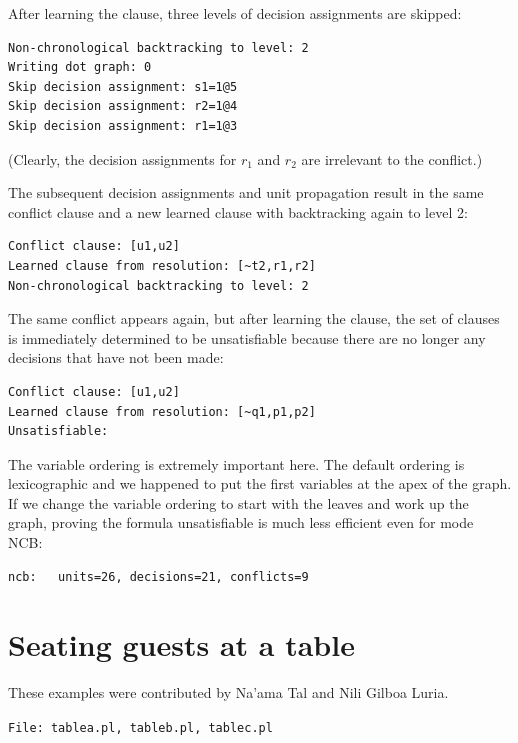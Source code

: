 \documentclass[11pt]{report}
\newcommand*{\p}[1]{\textup{\texttt{#1}}}
\newcommand*{\fl}[1]{\parbox{\textwidth}{\raggedleft \p{File: #1}}}
\begin{document}
After learning the clause, three levels of decision assignments are
skipped:
\begin{verbatim}
Non-chronological backtracking to level: 2
Writing dot graph: 0
Skip decision assignment: s1=1@5
Skip decision assignment: r2=1@4
Skip decision assignment: r1=1@3
\end{verbatim}
(Clearly, the decision assignments for $r_1$ and $r_2$ are irrelevant to
the conflict.)

The subsequent decision assignments and unit propagation result in the
same conflict clause and a new learned clause with backtracking again to
level 2:

\begin{verbatim}
Conflict clause: [u1,u2]
Learned clause from resolution: [~t2,r1,r2]
Non-chronological backtracking to level: 2
\end{verbatim}

The same conflict appears again, but after learning the clause, the set
of clauses is immediately determined to be unsatisfiable because there
are no longer any decisions that have not been made:

\begin{verbatim}
Conflict clause: [u1,u2]
Learned clause from resolution: [~q1,p1,p2]
Unsatisfiable:
\end{verbatim}

The variable ordering is extremely important here. The default ordering
is lexicographic and we happened to put the first variables at the apex
of the graph. If we change the variable ordering to start with the
leaves and work up the graph, proving the formula unsatisfiable is much
less efficient even for mode NCB:

\begin{verbatim}
ncb:   units=26, decisions=21, conflicts=9
\end{verbatim}


\section{Seating guests at a table}

\begin{center}
These examples were contributed by Na'ama Tal and Nili Gilboa Luria.
\end{center}

\fl{tablea.pl, tableb.pl, tablec.pl}
\end{document}
